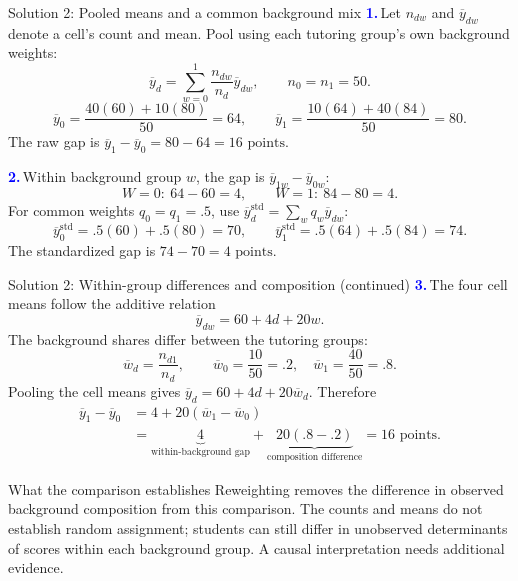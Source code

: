 \documentclass[notes,10pt, aspectratio=169]{beamer}
\newif\ifshowsolutions
\newcommand{\answerpart}[1]{\textcolor{blue}{\textbf{#1.}}\,}
\begin{document}
\ifshowsolutions
\begin{frame}{Solution 2: Pooled means and a common background mix}
\small
\answerpart{1}Let $n_{dw}$ and $\overline y_{dw}$ denote a cell's count and mean. Pool using each tutoring group's own background weights:
\[
\overline y_d=\sum_{w=0}^1\frac{n_{dw}}{n_d}\overline y_{dw},\qquad n_0=n_1=50.
\]
\[
\overline y_0=\frac{40(60)+10(80)}{50}=64,\qquad
\overline y_1=\frac{10(64)+40(84)}{50}=80.
\]
The raw gap is $\overline y_1-\overline y_0=80-64=\boxed{16\text{ points}}$.
\par\vspace{5pt}
\answerpart{2}Within background group $w$, the gap is $\overline y_{1w}-\overline y_{0w}$:
\[
W=0:\ 64-60=4,\qquad W=1:\ 84-80=4.
\]
For common weights $q_0=q_1=.5$, use $\overline y_d^{\mathrm{std}}=\sum_wq_w\overline y_{dw}$:
\[
\overline y_0^{\mathrm{std}}=.5(60)+.5(80)=70,\qquad
\overline y_1^{\mathrm{std}}=.5(64)+.5(84)=74.
\]
The standardized gap is $74-70=\boxed{4\text{ points}}$.
\end{frame}

\begin{frame}{Solution 2: Within-group differences and composition (continued)}
\small
\answerpart{3}The four cell means follow the additive relation
\[
\overline y_{dw}=60+4d+20w.
\]
The background shares differ between the tutoring groups:
\[
\overline w_d=\frac{n_{d1}}{n_d},\qquad
\overline w_0=\frac{10}{50}=.2,\quad
\overline w_1=\frac{40}{50}=.8.
\]
Pooling the cell means gives $\overline y_d=60+4d+20\overline w_d$. Therefore
\begin{align*}
\overline y_1-\overline y_0
&=4+20(\overline w_1-\overline w_0)\\
&=\underbrace{4}_{\text{within-background gap}}
+\underbrace{20(.8-.2)}_{\text{composition difference}}
=\boxed{16\text{ points}}.
\end{align*}
\begin{block}{What the comparison establishes}
Reweighting removes the difference in observed background composition from this comparison. The counts and means do not establish random assignment; students can still differ in unobserved determinants of scores within each background group. A causal interpretation needs additional evidence.
\end{block}
\end{frame}
\end{document}
